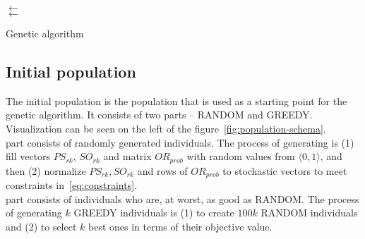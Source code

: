 \begin{algorithm}[H]
    \SetAlgoLined
    \LinesNumbered





    \Population $\leftarrow$ \GenerateInitialPopulation \\
    \Best $\leftarrow$ \SelectBest{\Population} \\

    \KwRet{\Best}

    \caption{Genetic algorithm}\label{alg:genetic}
\end{algorithm}

\subsection{Initial population}\label{subsec:initial-population}
The initial population is the population that is used as a starting point for the genetic algorithm.
It consists of two parts – RANDOM and GREEDY.
Visualization can be seen on the left of the figure~\ref{fig:population-schema}.
\\

 part consists of randomly generated individuals.
The process of generating is (1) fill vectors $PS_{rk}$, $SO_{rk}$ and matrix $OR_{prob}$ with random values from $\langle 0,1 \rangle$,
and then (2) normalize $PS_{rk}, SO_{rk}$ and rows of $OR_{prob}$  to stochastic vectors to meet constraints in~\ref{eq:constraints}.\\

 part consists of individuals who are, at worst, as good as RANDOM.
The process of generating $k$ GREEDY individuals is (1) to create $100k$ RANDOM individuals and (2) to select $k$ best ones
in terms of their objective value.\\

